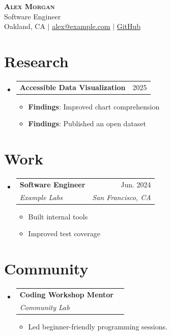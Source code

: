 \documentclass[letterpaper,11pt]{article}
\makeatletter
\newcommand{\resumeLink}[2]{\underline{\href{#1}{#2}}}
\newcommand{\resumeSection}[1]{\section{#1}}
\newcommand{\resumeSubHeadingListStart}{\begin{itemize}[leftmargin=0.15in, label={}]}
\newcommand{\resumeSubHeadingListEnd}{\end{itemize}}
\newcommand{\resumeItemListStart}{\begin{itemize}}
\newcommand{\resumeItemListEnd}{\end{itemize}\vspace{-5pt}}
\newcommand{\resumeItem}[1]{\item\small{{#1 \vspace{-2pt}}}}
\newcommand{\resumeSubheading}[4]{\vspace{-2pt}\item\begin{tabular*}{0.97\textwidth}[t]{l@{\extracolsep{\fill}}r}\textbf{#1} & #2 \\\textit{\small#3} & \textit{\small #4} \\\end{tabular*}\vspace{-7pt}}
\newcommand{\resumeProjectHeading}[2]{\item\begin{tabular*}{0.97\textwidth}{l@{\extracolsep{\fill}}r}\small#1 & #2 \\\end{tabular*}\vspace{-7pt}}
\newcommand{\resumeSingleLine}[2]{\resumeProjectHeading{\textbf{#1}}{#2}}
\makeatother
\begin{document}
\begin{center}
    \textbf{\Huge \scshape Alex Morgan} \\ \vspace{5pt}
    \small Software Engineer \\
    \small Oakland, CA $|$ \resumeLink{mailto:alex@example.com}{alex@example.com} $|$ \resumeLink{https://github.com/example}{GitHub} \\
\end{center}
\resumeSection{Research}
\resumeSubHeadingListStart
\resumeSingleLine{Accessible Data Visualization}{2025}
\resumeItemListStart
\resumeItem{\textbf{Findings}: Improved chart comprehension}
\resumeItem{\textbf{Findings}: Published an open dataset}
\resumeItemListEnd
\resumeSubHeadingListEnd
\resumeSection{Work}
\resumeSubHeadingListStart
\resumeSubheading{Software Engineer}{Jun. 2024}{Example Labs}{San Francisco, CA}
\resumeItemListStart
\resumeItem{Built internal tools}
\resumeItem{Improved test coverage}
\resumeItemListEnd
\resumeSubHeadingListEnd
\resumeSection{Community}
\resumeSubHeadingListStart
\resumeSubheading{Coding Workshop Mentor}{}{Community Lab}{}
\resumeItemListStart
\resumeItem{Led beginner-friendly programming sessions.}
\resumeItemListEnd
\resumeSubHeadingListEnd
\end{document}
